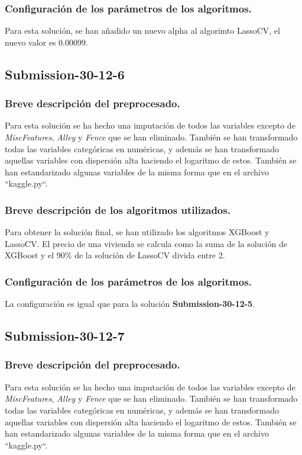 	\subsubsection{Configuración de los parámetros de los algoritmos.}
	Para esta solución, se han añadido un nuevo alpha al algorimto LassoCV, el nuevo valor es 0.00099.
	
	\subsection{Submission-30-12-6}
	\subsubsection{Breve descripción del preprocesado.}
	Para esta solución se ha hecho una imputación de todos las variables excepto de \textit{MiscFeatures}, \textit{Alley} y \textit{Fence} que se han eliminado. También se han transformado todas las variables categóricas en numéricas, y además se han transformado aquellas variables con dispersión alta haciendo el logaritmo de estos. También se han estandarizado algunas variables de la misma forma que en el archivo ``kaggle.py``.
	\subsubsection{Breve descripción de los algoritmos utilizados.}
		Para obtener la solución final, se han utilizado los algoritmos XGBoost y LassoCV. El precio de una vivienda se calcula como la suma de la solución de XGBoost y el 90\% de la solución de LassoCV divida entre 2.
	\subsubsection{Configuración de los parámetros de los algoritmos.}
	La configuración es igual que para la solución \textbf{Submission-30-12-5}.
	
	\subsection{Submission-30-12-7}
	\subsubsection{Breve descripción del preprocesado.}
	Para esta solución se ha hecho una imputación de todos las variables excepto de \textit{MiscFeatures}, \textit{Alley} y \textit{Fence} que se han eliminado. También se han transformado todas las variables categóricas en numéricas, y además se han transformado aquellas variables con dispersión alta haciendo el logaritmo de estos. También se han estandarizado algunas variables de la misma forma que en el archivo ``kaggle.py``.
